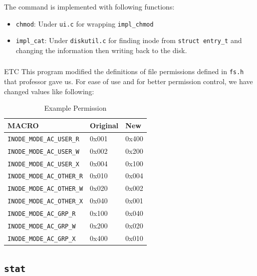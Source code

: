 \documentclass{homework}
\begin{document}
The command is implemented with following functions:
\begin{itemize}
    \item \texttt{chmod}: Under \texttt{ui.c} for wrapping \texttt{impl_chmod}
    \item \texttt{impl_cat}: Under \texttt{diskutil.c} for finding inode from \texttt{struct entry_t} and changing the information then writing back to the disk.
\end{itemize}

\subsubsection{}{ETC}
This program modified the definitions of file permissions defined in \texttt{fs.h} that professor gave us. For ease of use and for better permission control, we have changed values like following:

\begin{center}
\begin{table}[h]
\begin{tabularx}{1.0\textwidth} { 
  | >{\centering\arraybackslash}X 
  | >{\centering\arraybackslash}X 
  | >{\centering\arraybackslash}X | }
 \hline
   MACRO & Original & New \\
     \hline
   \texttt{INODE_MODE_AC_USER_R} & 0x001	& 0x400 \\
    \hline
   \texttt{INODE_MODE_AC_USER_W} & 0x002	& 0x200 \\
    \hline
   \texttt{INODE_MODE_AC_USER_X} & 0x004	& 0x100 \\
    \hline
   \texttt{INODE_MODE_AC_OTHER_R} & 0x010	& 0x004 \\
    \hline
   \texttt{INODE_MODE_AC_OTHER_W} & 0x020	& 0x002 \\
    \hline
   \texttt{INODE_MODE_AC_OTHER_X} & 0x040	& 0x001 \\
    \hline
   \texttt{INODE_MODE_AC_GRP_R} & 0x100	& 0x040 \\
    \hline
   \texttt{INODE_MODE_AC_GRP_W} & 0x200	& 0x020 \\
    \hline
   \texttt{INODE_MODE_AC_GRP_X} & 0x400	& 0x010 \\
    \hline
    
\end{tabularx}
\caption{Example Permission}
\end{table}
\end{center}

\subsection{\texttt{stat}}
\end{document}

